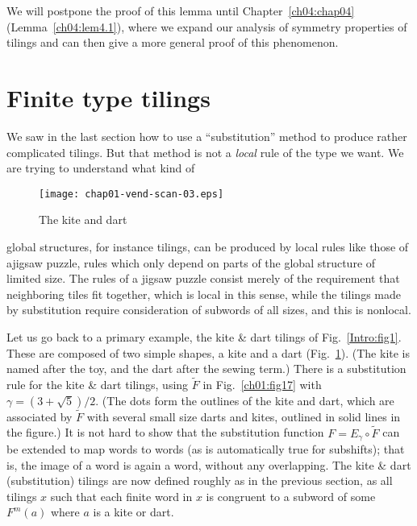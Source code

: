 \documentclass[reqno]{stml-l}
\theoremstyle{plain}
\theoremstyle{definition}
\numberwithin{equation}{chapter}
\begin{document}
We will postpone the proof of this lemma until Chapter~\ref{ch04:chap04} (Lemma~\ref{ch04:lem4.1}), where we expand our analysis of symmetry properties of tilings and can then give a more general proof of this phenomenon.

\section{Finite type tilings}\label{ch01:sec4}

We saw in the last section how to use a ``substitution'' method to produce rather complicated tilings. But that method is not a \emph{local} rule of the type we want. We are trying to understand what kind of
\begin{figure}[h]
\texttt{[image: chap01-vend-scan-03.eps]}
\caption{The kite and dart}
\label{ch01:fig16}
\end{figure}

\noindent global structures, for instance tilings, can be produced by local rules like those of ajigsaw puzzle, rules which only depend on parts of the global structure of limited size. The rules of a jigsaw puzzle consist merely of the requirement that neighboring tiles fit together, which is local in this sense, while the tilings made by substitution require consideration of subwords of all sizes, and this is nonlocal.

Let us go back to a primary example, the kite \& dart
tilings of Fig.~\ref{Intro:fig1}. These are composed of two
simple shapes, a kite and a dart (Fig.~\ref{ch01:fig16}).
(The kite is named after the toy, and the dart after the
sewing term.) There is a substitution rule for the kite \&
dart tilings, using $\tilde{F}$ in Fig.~\ref{ch01:fig17}
with $\gamma=(3+\sqrt{5})/2$. (The dots form the outlines
of the kite and dart, which are associated by $\tilde{F}$
with several small size darts and kites, outlined in solid
lines in the figure.) It is not hard to show that the
substitution function $F=E_{\gamma}\circ\tilde{F}$ can be
extended to map words to words (as is automatically true
for subshifts); that is, the image of a word is again a
word, without any overlapping. The kite \& dart
(substitution) tilings are now defined roughly as in the
previous section, as all tilings $x$ such that each finite
word in $x$ is congruent to a subword of some $F^{m}(a)$
where $a$ is a kite or dart.
\end{document}
